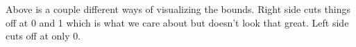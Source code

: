 {\nolan Above is a couple different ways of visualizing the bounds. Right side cuts things off at 0 and 1 which is what we care about but doesn't look that great. Left side cuts off at only 0. }

